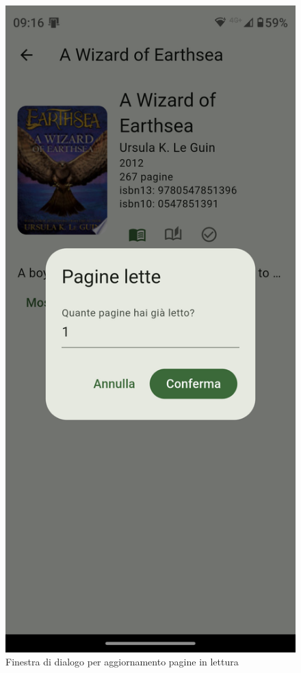 \documentclass{article}
\begin{document}
\begin{figure}[H]
  \centering
  \includegraphics[width=0.6\linewidth]{pages-read-f.png}
  \caption{Finestra di dialogo per aggiornamento pagine in lettura}
  \label{fig:sitemap}
\end{figure}
\end{document}
